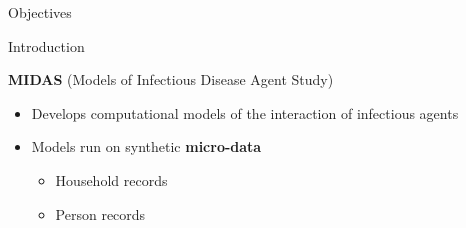 \documentclass[final]{beamer}
\newlength{\onecolwid}
\begin{document}
\begin{frame}[t]
\begin{columns}[t]
\begin{column}{\onecolwid}
\begin{alertblock}{Objectives}
\end{alertblock}


\begin{block}{Introduction}

\textbf{MIDAS} (Models of Infectious Disease Agent Study) 
\begin{itemize}
\item Develops computational models of the interaction of infectious agents
\item Models run on synthetic \textbf{micro-data}
\begin{itemize}
\item Household records


\begin{table}
\centering
{}
\label{tab:synh1}
\end{table}

\item Person records
\begin{table}
\centering
{}
\label{tab:synp1}
\end{table}
\end{itemize}


\end{itemize}


\end{block}
\end{column}
\end{columns}
\end{frame}
\end{document}
